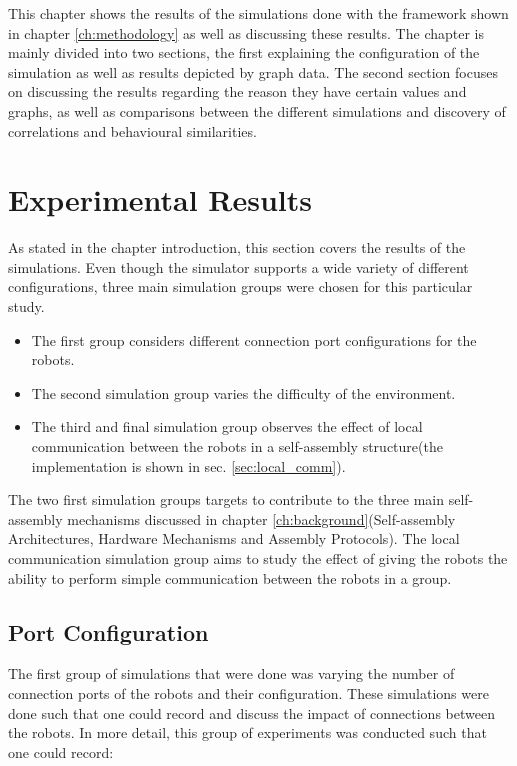 This chapter shows the results of the simulations done with the framework shown in chapter \ref{ch:methodology} as well as discussing these results.
The chapter is mainly divided into two sections, the first explaining the configuration of the simulation as well as results depicted by graph data.
The second section focuses on discussing the results regarding the reason they have certain values and graphs, as well as comparisons between the different simulations and discovery of correlations and behavioural similarities.

\section{Experimental Results}
As stated in the chapter introduction, this section covers the results of the simulations. 
Even though the simulator supports a wide variety of different configurations, three main simulation groups were chosen for this particular study.

\begin{itemize}
	\item The first group considers different connection port configurations for the robots.
	\item The second simulation group varies the difficulty of the environment.
	\item The third and final simulation group observes the effect of local communication between the robots in a self-assembly structure(the implementation is shown in sec. \ref{sec:local_comm}).
\end{itemize}

The two first simulation groups targets to contribute to the three main self-assembly mechanisms discussed in chapter \ref{ch:background}(Self-assembly Architectures, Hardware Mechanisms and Assembly Protocols).
The local communication simulation group aims to study the effect of giving the robots the ability to perform simple communication between the robots in a group.

\subsection{Port Configuration}
The first group of simulations that were done was varying the number of connection ports of the robots and their configuration.
These simulations were done such that one could record and discuss the impact of connections between the robots.
In more detail, this group of experiments was conducted such that one could record:

